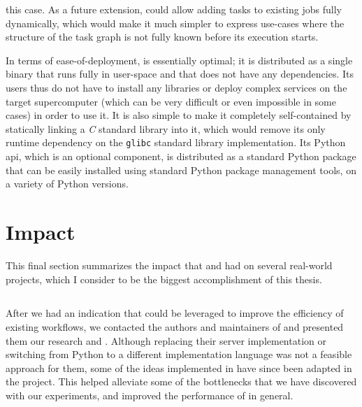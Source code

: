 \begin{description}[wide=0pt]
		this case. As a future extension, \hyperqueue{} could allow adding tasks to existing
		jobs fully dynamically, which would make it much simpler to express use-cases where the structure
		of the task graph is not fully known before its execution starts.
	\item[Deployment] In terms of ease-of-deployment, \hyperqueue{} is essentially optimal; it is
		distributed as a single binary that runs fully in user-space and that does not have any
		dependencies. Its users thus do not have to install any libraries or deploy complex services on the
		target supercomputer (which can be very difficult or even impossible in some cases) in order to use
		it. It is also simple to make it completely self-contained by statically linking a
		\emph{C} standard library into it, which would remove its only runtime dependency
		on the \texttt{glibc} standard library implementation. Its Python
		\gls{api}, which is an optional component, is distributed as a standard Python
		package that can be easily installed using standard Python package management tools, on a variety
		of Python versions.
\end{description}

\section{Impact}
This final section summarizes the impact that \rsds{} and
\hyperqueue{} had on several real-world projects, which I consider to be the biggest
accomplishment of this thesis.

\subsection*{\rsds{}}
After we had an indication that \rsds{} could be leveraged to improve the
efficiency of existing \dask{} workflows, we contacted the authors and
maintainers of \dask{} and presented them our research and
\rsds{}. Although replacing their server implementation or switching from Python
to a different implementation language was not a feasible approach for them, some of the ideas
implemented in \rsds{} have since been adapted in the \dask{}
project. This helped alleviate some of the bottlenecks that we have discovered with our
experiments, and improved the performance of \dask{} in
general.

